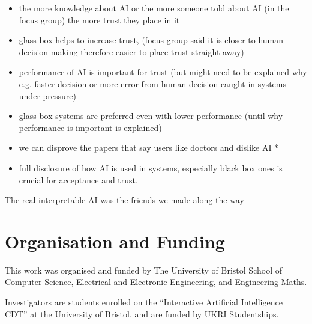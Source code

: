 \documentclass[manuscript,screen,review]{acmart}
\begin{document}
\begin{itemize}
    \item the more knowledge about AI or the more someone told about AI (in the focus group) the more trust they place in it
    \item glass box helps to increase trust, (focus group said it is closer to human decision making therefore easier to place trust straight away)
    \item performance of AI is important for trust (but might need to be explained why e.g. faster decision or more error from human decision caught in systems under pressure)
    \item glass box systems are preferred even with lower performance (until why performance is important is explained)
    \item we can disprove the papers that say users like doctors and dislike AI *
    \item full disclosure of how AI is used in systems, especially black box ones is crucial for acceptance and trust.
\end{itemize}



\begin{acks}
The real interpretable AI was the friends we made along the way
\end{acks}

\newpage



\appendix


\section{Organisation and Funding}


This work was organised and funded by The University of Bristol School of Computer Science, Electrical and Electronic Engineering, and Engineering Maths.

Investigators are students enrolled on the “Interactive Artificial Intelligence CDT” at the University of Bristol, and are funded by UKRI Studentships.
\end{document}
